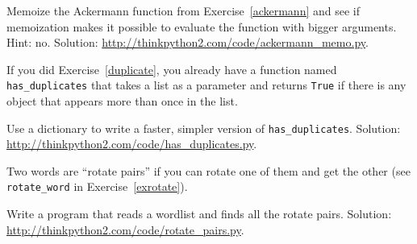 \documentclass[10pt]{book}
\begin{document}
\begin{exercise}
Memoize the Ackermann function from Exercise~\ref{ackermann} and see if
memoization makes it possible to evaluate the function with bigger
arguments.  Hint: no.
Solution: \url{http://thinkpython2.com/code/ackermann_memo.py}.

\end{exercise}



\begin{exercise}

If you did Exercise~\ref{duplicate}, you already have
a function named \verb"has_duplicates" that takes a list
as a parameter and returns {\tt True} if there is any object
that appears more than once in the list.

Use a dictionary to write a faster, simpler version of
\verb"has_duplicates".
Solution: \url{http://thinkpython2.com/code/has_duplicates.py}.

\end{exercise}


\begin{exercise}
\label{exrotatepairs}

Two words are ``rotate pairs'' if you can rotate one of them
and get the other (see \verb"rotate_word" in Exercise~\ref{exrotate}).

Write a program that reads a wordlist and finds all the rotate
pairs.  Solution: \url{http://thinkpython2.com/code/rotate_pairs.py}.

\end{exercise}
\end{document}
